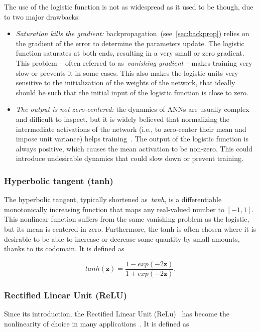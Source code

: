 The use of the logistic function is not as widespread as it used to be though,
due to two major drawbacks:
\begin{itemize}
    \item \emph{Saturation kills the gradient:}
        backpropagation~(see~\autoref{sec:backprop}) relies on the gradient of
        the error to determine the parameters update. The logistic function
        saturates at both ends, resulting in a very small or zero gradient.
        This problem -- often referred to as~\emph{vanishing gradient} -- makes
        training very slow or prevents it in some cases. This also makes the
        logistic units very sensitive to the initialization of the weights of
        the network, that ideally should be such that the initial input of the
        logistic function is close to zero.
    \item \emph{The output is not zero-centered:} the dynamics of ANNs are
        usually complex and difficult to inspect, but it is widely believed
        that normalizing the intermediate activations of the network (i.e., to
        zero-center their mean and impose unit variance) helps
        training~\citep{Ioffe+Szegedy-2015,Laurent2015,arpit2016normalization,
        cooijmans2016recurrent}. The output of the logistic function is always
        positive, which causes the mean activation to be non-zero. This could
        introduce undesirable dynamics that could slow down or prevent
        training.
\end{itemize}

\subsubsection{Hyperbolic tangent (tanh)}\label{sec:tanh}

The hyperbolic tangent, typically shortened as~\emph{tanh}, is a differentiable
monotonically increasing function that maps any real-valued number to $[-1, 1]$.
This nonlinear function suffers from the same vanishing problem as the
logistic, but its mean is centered in zero. Furthermore, the tanh is often
chosen where it is desirable to be able to increase or decrease some quantity
by small amounts, thanks to its codomain. It is defined as

\begin{equation}\label{eq:tanh}
    tanh(\mathbf{z}) = \frac{1-exp(-2\mathbf{z})}{1+exp(-2\mathbf{z})}.
\end{equation}


\subsubsection{Rectified Linear Unit (ReLU)}\label{sec:relu}
Since its introduction, the Rectified Linear Unit
(ReLu)~\citep{Jarrett-ICCV2009-small,Nair+Hinton-2010} has become the
nonlinearity of choice in many applications~\citep{Krizhevsky-2012,
LeCun-et-al-Nature2015,Glorot+al-AI-2011-small}. It is defined as

